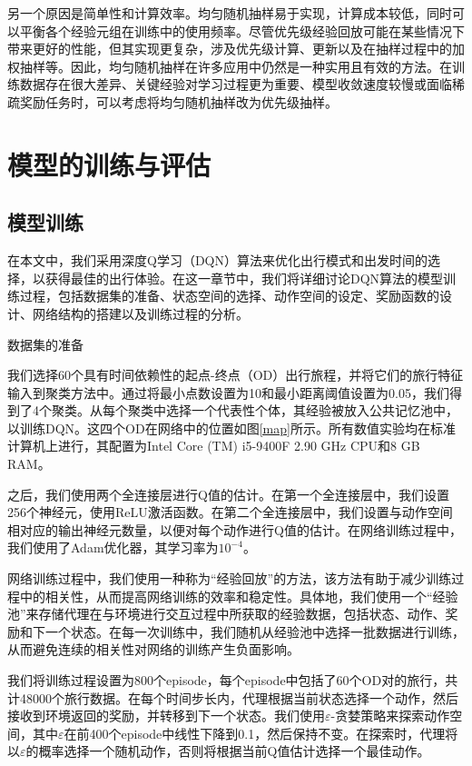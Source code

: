 另一个原因是简单性和计算效率。均匀随机抽样易于实现，计算成本较低，同时可以平衡各个经验元组在训练中的使用频率。尽管优先级经验回放可能在某些情况下带来更好的性能，但其实现更复杂，涉及优先级计算、更新以及在抽样过程中的加权抽样等。因此，均匀随机抽样在许多应用中仍然是一种实用且有效的方法。在训练数据存在很大差异、关键经验对学习过程更为重要、模型收敛速度较慢或面临稀疏奖励任务时，可以考虑将均匀随机抽样改为优先级抽样。

\section{模型的训练与评估}

\subsection{模型训练}

在本文中，我们采用深度Q学习（DQN）算法来优化出行模式和出发时间的选择，以获得最佳的出行体验。在这一章节中，我们将详细讨论DQN算法的模型训练过程，包括数据集的准备、状态空间的选择、动作空间的设定、奖励函数的设计、网络结构的搭建以及训练过程的分析。

数据集的准备

我们选择60个具有时间依赖性的起点-终点（OD）出行旅程，并将它们的旅行特征输入到聚类方法中。通过将最小点数设置为10和最小距离阈值设置为0.05，我们得到了4个聚类。从每个聚类中选择一个代表性个体，其经验被放入公共记忆池中，以训练DQN。这四个OD在网络中的位置如图\ref{map}所示。所有数值实验均在标准计算机上进行，其配置为Intel Core (TM) i5-9400F 2.90 GHz CPU和8 GB RAM。

之后，我们使用两个全连接层进行Q值的估计。在第一个全连接层中，我们设置256个神经元，使用ReLU激活函数。在第二个全连接层中，我们设置与动作空间相对应的输出神经元数量，以便对每个动作进行Q值的估计。在网络训练过程中，我们使用了Adam优化器，其学习率为$10^{-4}$。

网络训练过程中，我们使用一种称为“经验回放”的方法，该方法有助于减少训练过程中的相关性，从而提高网络训练的效率和稳定性。具体地，我们使用一个“经验池”来存储代理在与环境进行交互过程中所获取的经验数据，包括状态、动作、奖励和下一个状态。在每一次训练中，我们随机从经验池中选择一批数据进行训练，从而避免连续的相关性对网络的训练产生负面影响。

我们将训练过程设置为800个episode，每个episode中包括了60个OD对的旅行，共计48000个旅行数据。在每个时间步长内，代理根据当前状态选择一个动作，然后接收到环境返回的奖励，并转移到下一个状态。我们使用$\varepsilon$-贪婪策略来探索动作空间，其中$\varepsilon$在前400个episode中线性下降到0.1，然后保持不变。在探索时，代理将以$\varepsilon$的概率选择一个随机动作，否则将根据当前Q值估计选择一个最佳动作。

